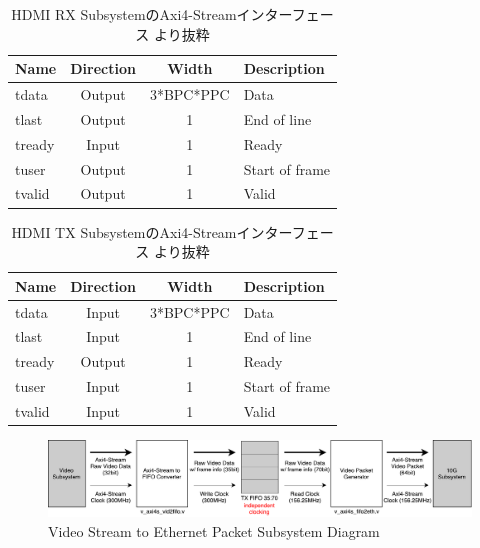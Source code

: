 
\begin{table}[htbp]
  \caption{HDMI RX SubsystemのAxi4-Streamインターフェース \cite{xilinx-pg236}より抜粋}
  \label{tb:pg236-vout-axi4-stream}
  \begin{center}
  \begin{tabular}{l|c|c|l}
    \hline
    Name   & Direction & Width     & Description \\\hline\hline
    tdata  & Output    & 3*BPC*PPC & Data \\\hline
    tlast  & Output    & 1         & End of line \\\hline
    tready & Input     & 1         & Ready \\\hline
    tuser  & Output    & 1         & Start of frame \\\hline
    tvalid & Output    & 1         & Valid \\\hline
  \end{tabular}\end{center}
\end{table}

\begin{table}[htbp]
  \caption{HDMI TX SubsystemのAxi4-Streamインターフェース \cite{xilinx-pg235}より抜粋}
  \label{tb:pg236-vin-axi4-stream}
  \begin{center}
  \begin{tabular}{l|c|c|l}
    \hline
    Name   & Direction & Width     & Description \\\hline\hline
    tdata  & Input     & 3*BPC*PPC & Data \\\hline
    tlast  & Input     & 1         & End of line \\\hline
    tready & Output    & 1         & Ready \\\hline
    tuser  & Input     & 1         & Start of frame \\\hline
    tvalid & Input     & 1         & Valid \\\hline
  \end{tabular}\end{center}
\end{table}

\begin{figure}[htbp]
    \begin{center}
        \includegraphics[bb=0 0 911 166,width=15.5cm]{img/fpga-video-ethernet-diagram.pdf}
    \end{center}
    \caption{Video Stream to Ethernet Packet Subsystem Diagram}
    \label{fig:fpga-video-ethernet-diagram}
\end{figure}

